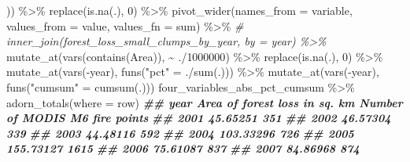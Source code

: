 \documentclass[10pt,landscape,a3paper]{article}
\newenvironment{Shaded}{\begin{snugshade}}{\end{snugshade}}
\newcommand{\AttributeTok}[1]{\textcolor[rgb]{0.77,0.63,0.00}{#1}}
\newcommand{\CommentTok}[1]{\textcolor[rgb]{0.56,0.35,0.01}{\textit{#1}}}
\newcommand{\DecValTok}[1]{\textcolor[rgb]{0.00,0.00,0.81}{#1}}
\newcommand{\DocumentationTok}[1]{\textcolor[rgb]{0.56,0.35,0.01}{\textbf{\textit{#1}}}}
\newcommand{\FunctionTok}[1]{\textcolor[rgb]{0.00,0.00,0.00}{#1}}
\newcommand{\NormalTok}[1]{#1}
\newcommand{\OtherTok}[1]{\textcolor[rgb]{0.56,0.35,0.01}{#1}}
\newcommand{\SpecialCharTok}[1]{\textcolor[rgb]{0.00,0.00,0.00}{#1}}
\newcommand{\StringTok}[1]{\textcolor[rgb]{0.31,0.60,0.02}{#1}}
\begin{document}
\begin{Shaded}
\begin{Highlighting}[]
\NormalTok{  )) }\SpecialCharTok{\%\textgreater{}\%}
  \FunctionTok{replace}\NormalTok{(}\FunctionTok{is.na}\NormalTok{(.), }\DecValTok{0}\NormalTok{) }\SpecialCharTok{\%\textgreater{}\%} 
  \FunctionTok{pivot\_wider}\NormalTok{(}\AttributeTok{names\_from =} \StringTok{\textquotesingle{}variable\textquotesingle{}}\NormalTok{, }\AttributeTok{values\_from =} \StringTok{\textquotesingle{}value\textquotesingle{}}\NormalTok{, }\AttributeTok{values\_fn =}\NormalTok{ sum) }\SpecialCharTok{\%\textgreater{}\%} 
  \CommentTok{\# inner\_join(forest\_loss\_small\_clumps\_by\_year, by = \textquotesingle{}year\textquotesingle{}) \%\textgreater{}\% }
  \FunctionTok{mutate\_at}\NormalTok{(}\FunctionTok{vars}\NormalTok{(}\FunctionTok{contains}\NormalTok{(}\StringTok{\textquotesingle{}Area\textquotesingle{}}\NormalTok{)), }\SpecialCharTok{\textasciitilde{}}\NormalTok{ .}\SpecialCharTok{/}\DecValTok{1000000}\NormalTok{) }\SpecialCharTok{\%\textgreater{}\%}
  \FunctionTok{replace}\NormalTok{(}\FunctionTok{is.na}\NormalTok{(.), }\DecValTok{0}\NormalTok{) }\SpecialCharTok{\%\textgreater{}\%} 
  \FunctionTok{mutate\_at}\NormalTok{(}\FunctionTok{vars}\NormalTok{(}\SpecialCharTok{{-}}\StringTok{\textquotesingle{}year\textquotesingle{}}\NormalTok{), }\FunctionTok{funs}\NormalTok{(}\StringTok{"pct"} \OtherTok{=}\NormalTok{ .}\SpecialCharTok{/}\FunctionTok{sum}\NormalTok{(.))) }\SpecialCharTok{\%\textgreater{}\%} 
  \FunctionTok{mutate\_at}\NormalTok{(}\FunctionTok{vars}\NormalTok{(}\SpecialCharTok{{-}}\StringTok{\textquotesingle{}year\textquotesingle{}}\NormalTok{), }\FunctionTok{funs}\NormalTok{(}\StringTok{"cumsum"} \OtherTok{=} \FunctionTok{cumsum}\NormalTok{(.)))}
\NormalTok{four\_variables\_abs\_pct\_cumsum }\SpecialCharTok{\%\textgreater{}\%}
  \FunctionTok{adorn\_totals}\NormalTok{(}\AttributeTok{where =} \StringTok{\textquotesingle{}row\textquotesingle{}}\NormalTok{)}
\DocumentationTok{\#\#   year Area of forest loss in sq. km Number of MODIS M6 fire points}
\DocumentationTok{\#\#   2001                      45.65251                            351}
\DocumentationTok{\#\#   2002                      46.57304                            339}
\DocumentationTok{\#\#   2003                      44.48116                            592}
\DocumentationTok{\#\#   2004                     103.33296                            726}
\DocumentationTok{\#\#   2005                     155.73127                           1615}
\DocumentationTok{\#\#   2006                      75.61087                            837}
\DocumentationTok{\#\#   2007                      84.86968                            874}

\end{Highlighting}
\end{Shaded}
\end{document}
